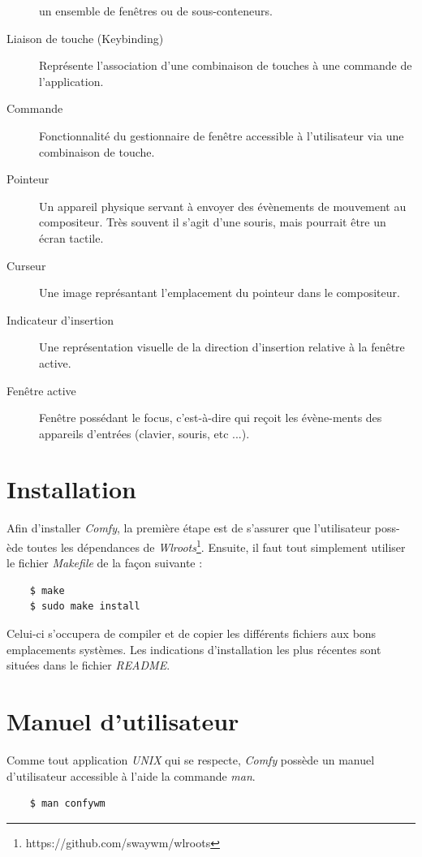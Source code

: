 \documentclass[titlepage]{article}
\begin{document}
\begin{description}
		un ensemble de fenêtres ou de
		sous-conteneurs.
	\item [Liaison de touche (Keybinding)] Représente l'association d'une combinaison de touches à une commande de l'application.
	\item [Commande] Fonctionnalité du gestionnaire de fenêtre accessible à l'utilisateur via une combinaison de touche.
	\item [Pointeur] Un appareil physique servant à envoyer des évènements de mouvement au compositeur. Très souvent il s'agit d'une souris, mais pourrait être un écran tactile.
	\item [Curseur] Une image représantant l'emplacement du pointeur dans le compositeur.
	\item [Indicateur d'insertion] Une représentation visuelle de la direction d'insertion relative à la fenêtre active.
	\item [Fenêtre active] Fenêtre possédant le focus, c'est-à-dire qui reçoit les évène-ments des appareils d'entrées (clavier, souris, etc ...).
\end{description}

\section{Installation}
Afin d'installer \textit{Comfy}, la première étape est de s'assurer que l'utilisateur poss-ède toutes les dépendances de \textit{Wlroots}\footnote{https://github.com/swaywm/wlroots}. Ensuite, il faut tout simplement utiliser le fichier \textit{Makefile} de la façon suivante :
\begin{verbatim}
	$ make
	$ sudo make install
\end{verbatim}

\par
Celui-ci s'occupera de compiler et de copier les différents fichiers aux bons emplacements systèmes. Les indications d'installation les plus récentes sont situées dans le fichier \textit{README}.

\section{Manuel d'utilisateur}
Comme tout application \textit{UNIX} qui se respecte, \textit{Comfy} possède un manuel d'utilisateur accessible à l'aide la commande \textit{man}.

\begin{verbatim}
	$ man confywm
\end{verbatim}
\end{document}
